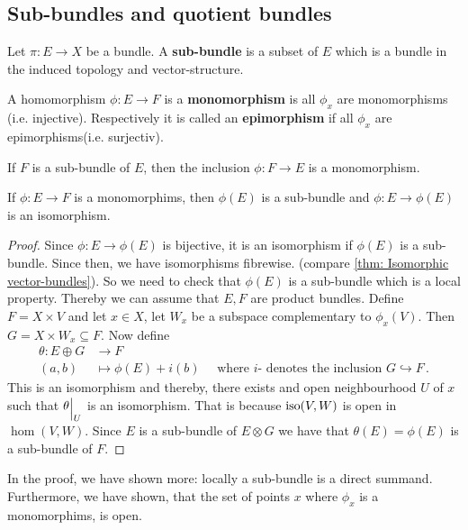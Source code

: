 \subsection{Sub-bundles and quotient bundles}
\begin{definition}\label{def: Sub-bundles}
	Let $\pi:E\to X$ be a bundle. A \textbf{sub-bundle} is a subset of $E$ which is a bundle in the induced topology and vector-structure.     
\end{definition}
\begin{definition}\label{def: Mono- and epimorphism}
	A homomorphism $\phi: E\to F$ is a \textbf{monomorphism} is all $\phi_x$ are monomorphisms (i.e. injective). Respectively it is called an \textbf{epimorphism} if all $\phi_x$ are epimorphisms(i.e. surjectiv).
\end{definition}
\begin{cor}
	If $F$ is a sub-bundle of $E$, then the inclusion $\phi:F\to E$ is a monomorphism.
\end{cor}
\newpage
\begin{lemma} \label{lem: monos induce sub-bundles}
	If $\phi:E \to F$ is a monomorphims, then $\phi(E)$ is a sub-bundle and $\phi:E\to \phi(E)$ is an isomorphism. 
\end{lemma}
\begin{proof}
	Since $\phi:E\to \phi(E)$ is bijective, it is an isomorphism if $\phi(E)$ is a sub-bundle. Since then, we have isomorphisms fibrewise. (compare \ref{thm: Isomorphic vector-bundles}). So we need to check that $\phi(E)$ is a sub-bundle which is a local property. Thereby we can assume that $E,F$ are product bundles. Define  $F=X\times V$ and let $x\in X$, let $W_x$ be a subspace complementary to $\phi_x(V)$. Then $G=X\times W_x\subseteq F$. Now define
	\begin{align*}
		\theta:E\oplus G &\to F\\
		(a,b)&\mapsto \phi(E)+i(b)\quad \text{ where $i$- denotes the inclusion }G\hookrightarrow F \, .
	\end{align*} This is an isomorphism and thereby, there exists and open neighbourhood $U$ of $x$ such that ${\theta}\einsch{U}$ is an isomorphism.  That is because $\mathrm{iso}(V,W)$ is open in $\hom(V,W)$. Since $E$ is a sub-bundle of $E\otimes G$ we have that $\theta(E)=\phi(E)$ is a sub-bundle of $F$. 
\end{proof}
\begin{cor}
	In the proof, we have shown more: locally a sub-bundle is a direct summand. Furthermore, we have shown, that the set of points $x$ where $\phi_x$ is a monomorphims, is open.
\end{cor}
